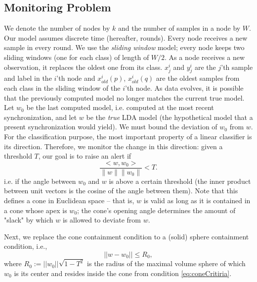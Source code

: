 \subsection{Monitoring Problem}
We denote the number of nodes by $k$ and the number of samples in a node by $W$.
Our model assumes discrete time (hereafter, rounds). Every node receives a new sample
in every round. We use the \textit{sliding window} model; every node keeps two sliding windows (one for each class) of length of $W/2$. As a node receives a new observation, it replaces the oldest one from its class.
$x^i_j$ and $y^i_j$ are the $j$'th sample and label in the $i$'th node
and $x_{old}^i(p)$, $x_{old}^i(q)$ are the oldest samples from each class in
the sliding window of the $i$'th node.
As data evolves, it is possible that the previously computed model
no longer matches the current true model. Let $w_0$ be the last computed model, i.e. computed at the most recent synchronization, and let $w$ be the \textit{true} LDA model (the hypothetical model that a present synchronization would yield).
We must bound the deviation of $w_0$ from $w$.
For the classification purpose, the most important property of a linear classifier is its direction. Therefore, we monitor the change in this direction: given a threshold $T$, our goal is to raise an alert if
\begin{equation} \label{eq:coneCritiria}
\frac{<w,w_0>}{\parallel w \parallel \parallel w_0 \parallel}  < T.
\end{equation}
i.e. if the angle between $w_0$ and $w$ is above a certain threshold (the inner product between unit vectors is the cosine of the angle between them). Note that this
defines a cone in Euclidean space -- that is, $w$ is valid as long as it is
contained in a cone whose apex is $w_0$; the cone's opening angle determines
the amount of "slack" by which $w$ is allowed to deviate from $w$.

Next, we replace the cone containment condition to a (solid) sphere containment condition, i.e., 
\begin{equation} \label{eq:critiria}
||w-w_0||   \leq  R_0,
\end{equation}
where $R_0 := ||w_0|| \sqrt{1-T^2}$ is the radius of the maximal volume sphere of which $w_0$ is its center and resides inside the cone from condition \ref{eq:coneCritiria}.


